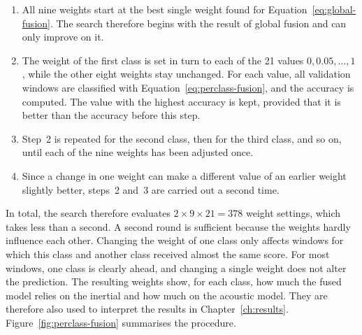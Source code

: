 \begin{enumerate}
  \item All nine weights start at the best single weight found for
  Equation~\ref{eq:global-fusion}. The search therefore begins with the result of
  global fusion and can only improve on it.
  \item The weight of the first class is set in turn to each of the 21 values
  $0, 0.05, \dots, 1$, while the other eight weights stay unchanged. For each
  value, all validation windows are classified with
  Equation~\ref{eq:perclass-fusion}, and the accuracy is computed. The value with
  the highest accuracy is kept, provided that it is better than the accuracy
  before this step.
  \item Step~2 is repeated for the second class, then for the third class, and so
  on, until each of the nine weights has been adjusted once.
  \item Since a change in one weight can make a different value of an earlier
  weight slightly better, steps~2 and~3 are carried out a second time.
\end{enumerate}

In total, the search therefore evaluates $2 \times 9 \times 21 = 378$ weight
settings, which takes less than a second. A second round is sufficient because
the weights hardly influence each other. Changing the weight of one class only
affects windows for which this class and another class received almost the same
score. For most windows, one class is clearly ahead, and changing a single weight
does not alter the prediction. The resulting weights show, for each class, how
much the fused model relies on the inertial and how much on the acoustic model.
They are therefore also used to interpret the results in
Chapter~\ref{ch:results}. Figure~\ref{fig:perclass-fusion} summarises the
procedure.

